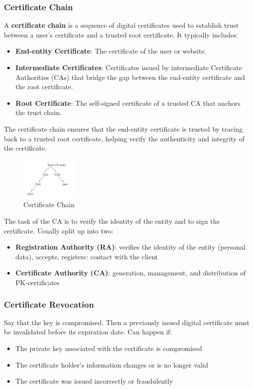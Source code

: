 \subsubsection{Certificate Chain}
A \textbf{certificate chain} is a sequence of digital certificates used to establish trust between a user's certificate and a trusted root certificate. It typically includes:

\begin{itemize}
    \item \textbf{End-entity Certificate}: The certificate of the user or website.
    \item \textbf{Intermediate Certificates}: Certificates issued by intermediate Certificate Authorities (CAs) that bridge the gap between the end-entity certificate and the root certificate.
    \item \textbf{Root Certificate}: The self-signed certificate of a trusted CA that anchors the trust chain.
\end{itemize}

The certificate chain ensures that the end-entity certificate is trusted by tracing back to a trusted root certificate, helping verify the authenticity and integrity of the certificate.

\begin{figure}[h!]
    \centering
    \includegraphics[width=0.25\textwidth]{img/cchain.png}
    \caption{Certificate Chain}
\end{figure}

The task of the CA is to verify the identity of the entity and to sign the certificate. Usually split up into two:

\begin{itemize}
    \item \textbf{Registration Authority (RA)}: verifies the identity of the entity (personal data), accepts, registers: contact with the client
    \item \textbf{Certificate Authority (CA)}: generation, management, and distribution of PK-certificates
\end{itemize}

\subsubsection{Certificate Revocation}
Say that the key is compromised. Then a previously issued digital certificate must be invalidated before its expiration date.
Can happen if:
\begin{itemize}
    \item The private key associated with the certificate is compromised
    \item The certificate holder's information changes or is no longer valid
    \item The certificate was issued incorrectly or fraudulently
\end{itemize}

